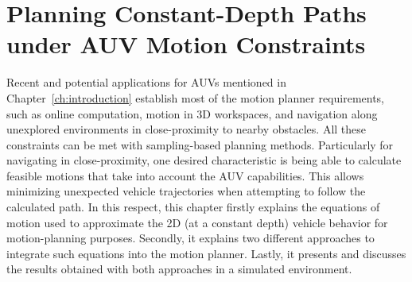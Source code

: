 
\chapter{Planning Constant-Depth Paths under AUV Motion Constraints}
\label{ch:motion_constratins}



\ifpdf
    \graphicspath{{3_motion_constraints/figures/PNG/}{3_motion_constraints/figures/PDF/}{3_motion_constraints/figures/}}
\else
    \graphicspath{{3_motion_constraints/figures/EPS/}{3_motion_constraints/figures/}}
\fi



Recent and potential applications for \acp{AUV} mentioned in
Chapter~\ref{ch:introduction} establish most of the motion planner requirements,
such as online computation, motion in \ac{3D} workspaces, and navigation along
unexplored environments in close-proximity to nearby obstacles. All these
constraints can be met with sampling-based planning methods. Particularly for
navigating in close-proximity, one desired characteristic is being able to
calculate feasible motions that take into account the \ac{AUV}
capabilities. This allows minimizing unexpected vehicle trajectories when
attempting to follow the calculated path. In this respect, this chapter firstly
explains the equations of motion used to approximate the \ac{2D} (at a constant
depth) vehicle behavior for motion-planning purposes. Secondly, it explains two
different approaches to integrate such equations into the motion planner.
Lastly, it presents and discusses the results obtained with both approaches in a
simulated environment.

